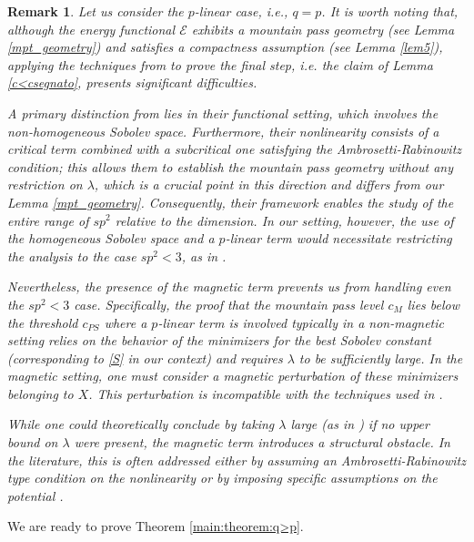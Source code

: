 \documentclass[leqno,11pt]{amsart}
\numberwithin{equation}{section}
\newtheorem{remark}[theorem]{Remark}
\begin{document}
\begin{remark}\label{q=pprob}
Let us consider the $p$-linear case, i.e., $q=p$. It is worth noting that, although the energy functional $\mathcal{E}$ exhibits a mountain pass geometry (see Lemma \ref{mpt_geometry}) and satisfies a compactness assumption (see Lemma \ref{lem5}), applying the techniques from \cite{bfk} to prove the final step, i.e. the claim of Lemma \ref{c<csegnato}, presents significant difficulties.

A primary distinction from \cite{bfk} lies in their functional setting, which involves the non-homogeneous Sobolev space. Furthermore, their nonlinearity consists of a critical term combined with a subcritical one satisfying the Ambrosetti-Rabinowitz condition; this allows them to establish the mountain pass geometry without any restriction on $\lambda$, which is a crucial point in this direction and differs from our Lemma \ref{mpt_geometry}. Consequently, their framework enables the study of the entire range of $sp^2$ relative to the dimension. In our setting, however, the use of the homogeneous Sobolev space and a $p$-linear term would necessitate restricting the analysis to the case $sp^2 < 3$, as in \cite{BonderSaintierSilva}.

Nevertheless, the presence of the magnetic term prevents us from handling even the $sp^2 < 3$ case. Specifically, the proof that the mountain pass level $c_M$ lies below the threshold $c_{PS}$ where a $p$-linear term is involved typically in a non-magnetic setting relies on the behavior of the minimizers for the best Sobolev constant (corresponding to \eqref{S} in our context) and requires $\lambda$ to be sufficiently large. In the magnetic setting, one must consider a magnetic perturbation of these minimizers belonging to $X$. This perturbation is incompatible with the techniques used in \cite{BonderSaintierSilva}. 

While one could theoretically conclude by taking $\lambda$ large (as in \cite{bfk}) if no upper bound on $\lambda$ were present, the magnetic term introduces a structural obstacle. In the literature, this is often addressed either by assuming an Ambrosetti-Rabinowitz type condition on the nonlinearity \cite{Ambrosio_schrodinger, bfk} or by imposing specific assumptions on the potential \cite{chabszulkin}.
\end{remark}





We are ready to prove Theorem \ref{main:theorem:q>p}. 
\end{document}
